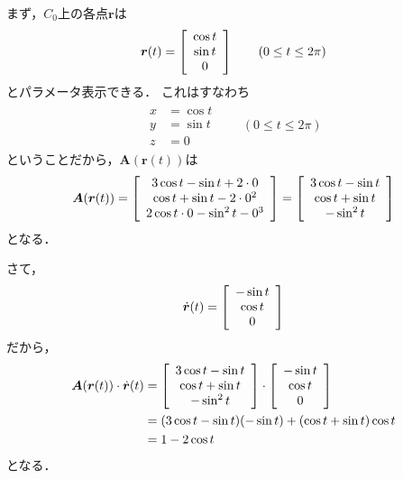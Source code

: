 まず，$C_0$上の各点$\bm{r}$は
\begin{align*}
\bm{r} (t) = \left[
\renewcommand{\arraystretch}{1}
\begin{array}{c}
\cos t \\
\sin t \\
0
\end{array}
\right]
\qquad (0 \leq t \leq 2 \pi)
\end{align*}
とパラメータ表示できる．
これはすなわち
\begin{align*}
\begin{aligned}
x & = \cos t \\
y & = \sin t \\
z & = 0
\end{aligned}
\qquad (0 \leq t \leq 2 \pi)
\end{align*}
ということだから，$\bm{A}(\bm{r}(t))$は
\begin{align*}
\bm{A}(\bm{r}(t)) = \left[
\renewcommand{\arraystretch}{1}
\begin{array}{c}
3 \cos t - \sin t + 2 \cdot 0 \\
\cos t + \sin t - 2 \cdot 0^2 \\
2 \cos t \cdot 0 - \sin^2 t - 0^3 
\end{array}
\right] = \left[
\renewcommand{\arraystretch}{1}
\begin{array}{c}
3 \cos t - \sin t \\
\cos t + \sin t \\
- \sin ^2 t 
\end{array}
\right]
\end{align*}
となる．

さて，
\begin{align*}
\dot{ \bm{r} } (t) = \left[
\renewcommand{\arraystretch}{1}
\begin{array}{c} 
- \sin t \\
\cos t \\
0
\end{array}
\right]
\end{align*}
だから，
\begin{align*}
\bm{A}(\bm{r}(t)) \cdot \dot{ \bm{r} }(t) & = \left[
\renewcommand{\arraystretch}{1}
\begin{array}{c}
3 \cos t - \sin t \\
\cos t + \sin t \\
- \sin^2 t 
\end{array}
\right] \cdot \left[
\renewcommand{\arraystretch}{1}
\begin{array}{c}
- \sin t \\
\cos t \\
0
\end{array}
\right] \\
& = (3 \cos t -\sin t ) (- \sin t) + ( \cos t + \sin t ) \cos t \\
& = 1 - 2 \cos t 
\end{align*}
となる．

